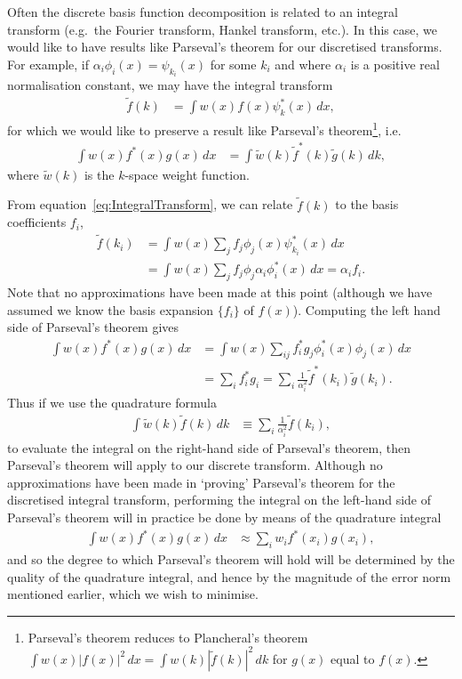 \documentclass[aip,amsmath,amssymb,reprint,twocolumn]{revtex4-1}
\begin{document}
Often the discrete basis function decomposition is related to an integral transform (e.g.\ the Fourier transform, Hankel transform, etc.).  In this case, we would like to have results like Parseval's theorem for our discretised transforms.  For example, if $\alpha_i \phi_i(x) =  \psi_{k_i}(x)$ for some $k_i$ and where $\alpha_i$ is a positive real normalisation constant, we may have the integral transform
\begin{align}
  \tilde{f}(k) &= \int w(x) f(x) \psi^*_k(x)\, dx, \label{eq:IntegralTransform}
\end{align}
for which we would like to preserve a result like Parseval's theorem\footnote{Parseval's theorem reduces to Plancheral's theorem $\int w(x) |f(x)|^2\, dx = \int w(k) |\tilde{f}(k)|^2\, dk$ for $g(x)$ equal to $f(x)$.}, i.e.
\begin{align}
  \int w(x) f^*(x) g(x)\, dx &= \int \tilde{w}(k) \tilde{f}^*(k) \tilde{g}(k)\, dk,
\end{align}
where $\tilde{w}(k)$ is the $k$-space weight function.

From equation~\eqref{eq:IntegralTransform}, we can relate $\tilde{f}(k)$ to the basis coefficients $f_i$,
\begin{align}
  \tilde{f}(k_i) &= \int w(x) \sum_j f_j \phi_j(x) \psi_{k_i}^*(x) \, dx \\
  &= \int w(x) \sum_j f_j \phi_j \alpha_i \phi_i^*(x)\, dx = \alpha_i f_i.
\end{align}
Note that no approximations have been made at this point (although we have assumed we know the basis expansion $\{f_i\}$ of $f(x)$).  Computing the left hand side of Parseval's theorem gives
\begin{align}
  \int w(x) f^*(x) g(x)\, dx &= \int w(x) \sum_{ij} f_i^* g_j \phi_i^*(x) \phi_j(x)\, dx\\
   &= \sum_i f_i^* g_i = \sum_i \frac{1}{\alpha_i^2} \tilde{f}^*(k_i) \tilde{g}(k_i).
\end{align}
Thus if we use the quadrature formula
\begin{align}
  \int \tilde{w}(k) \tilde{f}(k) \, dk &\equiv \sum_i \frac{1}{\alpha_i^2} \tilde{f}(k_i),
\end{align}
to evaluate the integral on the right-hand side of Parseval's theorem, then Parseval's theorem will apply to our discrete transform.  Although no approximations have been made in `proving' Parseval's theorem for the discretised integral transform, performing the integral on the left-hand side of Parseval's theorem will in practice be done by means of the quadrature integral
\begin{align}
  \int w(x) f^*(x) g(x)\, dx &\approx \sum_i w_i f^*(x_i) g(x_i),
\end{align}
and so the degree to which Parseval's theorem will hold will be determined by the quality of the quadrature integral, and hence by the magnitude of the error norm mentioned earlier, which we wish to minimise.
\end{document}
